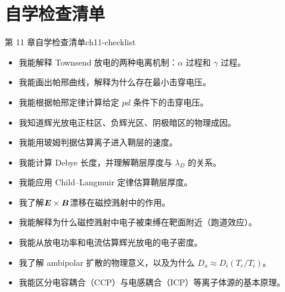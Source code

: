
\section{自学检查清单}

\begin{checklistbox}{第 11 章自学检查清单}{ch11-checklist}
\begin{itemize}[leftmargin=*,label=$\square$]
\item[$\square$] 我能解释 Townsend 放电的两种电离机制：$\alpha$ 过程和 $\gamma$ 过程。
\item[$\square$] 我能画出帕邢曲线，解释为什么存在最小击穿电压。
\item[$\square$] 我能根据帕邢定律计算给定 $pd$ 条件下的击穿电压。
\item[$\square$] 我知道辉光放电正柱区、负辉光区、阴极暗区的物理成因。
\item[$\square$] 我能用玻姆判据估算离子进入鞘层的速度。
\item[$\square$] 我能计算 Debye 长度，并理解鞘层厚度与 $\lambda_D$ 的关系。
\item[$\square$] 我能应用 Child--Langmuir 定律估算鞘层厚度。
\item[$\square$] 我了解$\bm{E}\times\bm{B}$漂移在磁控溅射中的作用。
\item[$\square$] 我能解释为什么磁控溅射中电子被束缚在靶面附近（跑道效应）。
\item[$\square$] 我能从放电功率和电流估算辉光放电的电子密度。
\item[$\square$] 我了解 ambipolar 扩散的物理意义，以及为什么 $D_a \approx D_i(T_e/T_i)$。
\item[$\square$] 我能区分电容耦合（CCP）与电感耦合（ICP）等离子体源的基本原理。
\end{itemize}
\end{checklistbox}


\endinput
